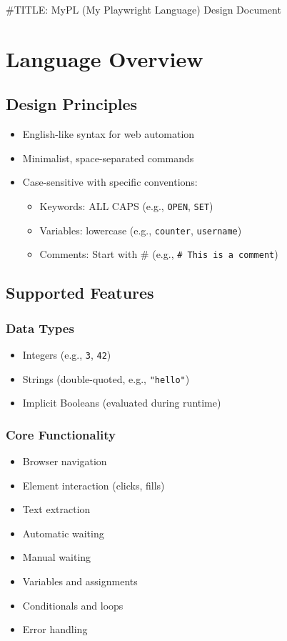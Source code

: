 \documentclass[11pt]{article}
\author{Muhammad Maaz Ahmed}
\date{\today}
\title{}
\begin{document}
\tableofcontents

\#TITLE: MyPL (My Playwright Language) Design Document
\section{Language Overview}
\label{sec:org7ae3bed}
\subsection{Design Principles}
\label{sec:org3a83d57}
\begin{itemize}
\item English-like syntax for web automation
\item Minimalist, space-separated commands
\item Case-sensitive with specific conventions:
\begin{itemize}
\item Keywords: ALL CAPS (e.g., \texttt{OPEN}, \texttt{SET})
\item Variables: lowercase (e.g., \texttt{counter}, \texttt{username})
\item Comments: Start with \# (e.g., \texttt{\# This is a comment})
\end{itemize}
\end{itemize}
\subsection{Supported Features}
\label{sec:org9a42180}
\subsubsection{Data Types}
\label{sec:org16e6507}
\begin{itemize}
\item Integers (e.g., \texttt{3}, \texttt{42})
\item Strings (double-quoted, e.g., \texttt{"hello"})
\item Implicit Booleans (evaluated during runtime)
\end{itemize}
\subsubsection{Core Functionality}
\label{sec:orgfb08050}
\begin{itemize}
\item Browser navigation
\item Element interaction (clicks, fills)
\item Text extraction
\item Automatic waiting
\item Manual waiting
\item Variables and assignments
\item Conditionals and loops
\item Error handling
\end{itemize}
\end{document}
